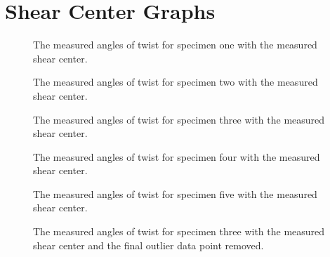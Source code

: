 \documentclass[12 pt]{report}
\begin{document}
\section{Shear Center Graphs} \label{sec:shear_center_graphs}
\begin{figure}[htbp]
	\centering
	
	\caption{The measured angles of twist for specimen one with the measured shear center.}
	\label{fig:specimen_1_sc}
\end{figure}
\begin{figure}[htbp]
	\centering
	
	\caption{The measured angles of twist for specimen two with the measured shear center.}
	\label{fig:specimen_2_sc}
\end{figure}
\begin{figure}[htbp]
	\centering
	
	\caption{The measured angles of twist for specimen three with the measured shear center.}
	\label{fig:specimen_3_sc}
\end{figure}
\begin{figure}[htbp]
	\centering
	
	\caption{The measured angles of twist for specimen four with the measured shear center.}
	\label{fig:specimen_4_sc}
\end{figure}
\begin{figure}[htbp]
	\centering
	
	\caption{The measured angles of twist for specimen five with the measured shear center.}
	\label{fig:specimen_5_sc}
\end{figure}
\begin{figure}[htbp]
	\centering
	
	\caption{The measured angles of twist for specimen three with the measured shear center and the final outlier data point removed.}
	\label{fig:specimen_3_sc_modified}
\end{figure}
\end{document}
